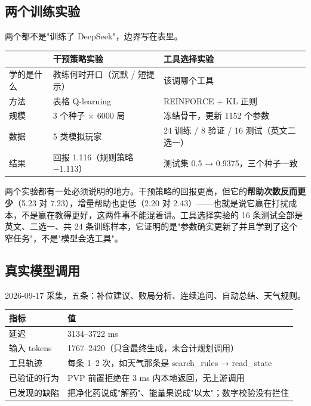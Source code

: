 \subsection{两个训练实验}

两个都不是"训练了 DeepSeek"，边界写在表里。

\begin{table}[h]
\centering
\small
\begin{tabular}{L{3.2cm}L{5.4cm}L{4.9cm}}
\toprule
 & 干预策略实验 & 工具选择实验 \\
\midrule
学的是什么 & 教练何时开口（沉默 / 短提示） & 该调哪个工具 \\
方法 & 表格 Q-learning & REINFORCE + KL 正则 \\
规模 & 3 个种子 × 6000 局 & 冻结骨干，更新 1152 个参数 \\
数据 & 5 类模拟玩家 & 24 训练 / 8 验证 / 16 测试（英文二选一） \\
结果 & 回报 1.116（规则策略 $-1.113$） & 测试集 0.5 → 0.9375，三个种子一致 \\
\bottomrule
\end{tabular}
\end{table}

两个实验都有一处必须说明的地方。干预策略的回报更高，但它的\textbf{帮助次数反而更少}（5.23 对 7.23），增量帮助也更低（2.20 对 2.43）——也就是说它赢在打扰成本，不是赢在教得更好，这两件事不能混着讲。工具选择实验的 16 条测试全部是英文、二选一、共 24 条训练样本，它证明的是"参数确实更新了并且学到了这个窄任务"，不是"模型会选工具"。

\subsection{真实模型调用}

2026-09-17 采集，五条：补位建议、败局分析、连续追问、自动总结、天气规则。

\begin{table}[h]
\centering
\small
\begin{tabular}{L{4.5cm}L{9cm}}
\toprule
指标 & 值 \\
\midrule
延迟 & 3134--3722 ms \\
输入 tokens & 1767--2420（只含最终生成，未合计规划调用） \\
工具轨迹 & 每条 1--2 次，如天气那条是 search\_rules → read\_state \\
已验证的行为 & PVP 前置拒绝在 3 ms 内本地返回，无上游调用 \\
已发现的缺陷 & 把净化药说成"解药"、能量果说成"以太"；数字校验没有拦住 \\
\bottomrule
\end{tabular}
\end{table}

